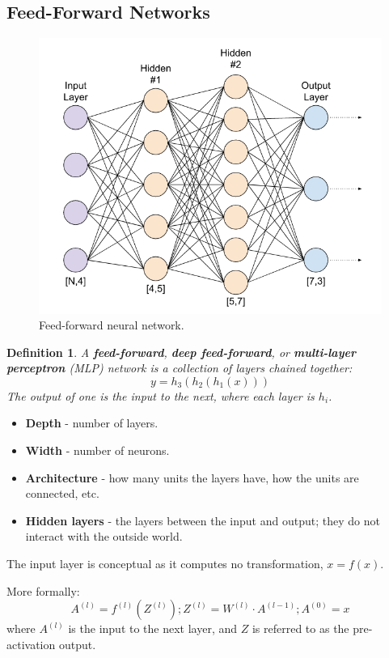 \documentclass[11pt]{article}
\newtheorem{defn}{Definition}
\begin{document}
\subsection{Feed-Forward Networks}
\begin{figure}[htb!]
  \centering
  \caption{Feed-forward neural network.}
  \includegraphics[scale=0.4]{ffnn}
\end{figure}
\begin{defn}
  A \textbf{feed-forward}, \textbf{deep feed-forward}, or \textbf{multi-layer perceptron} (MLP) network is a collection of layers chained together:
  \[
    y = h_3 (h_2 (h_1 (x))) 
  \]
  The output of one is the input to the next, where each layer is $h_i$.
\end{defn}

\begin{itemize}
  \item \textbf{Depth} - number of layers.
  \item \textbf{Width} - number of neurons.
  \item \textbf{Architecture} - how many units the layers have, how the units are connected, etc.
  \item \textbf{Hidden layers} - the layers between the input and output; they do not interact with the outside world.
\end{itemize}
The input layer is conceptual as it computes no transformation, $x = f(x)$.

More formally:
\[
  A^{(l)}  = f^{(l)} (Z^{(l)}); Z^{(l)} = W^{(l)} \cdot A^{(l - 1)}; A^{(0)} = x
\]
where $A^{(l)}$ is the input to the next layer, and $Z$ is referred to as the pre-activation output.
\end{document}
